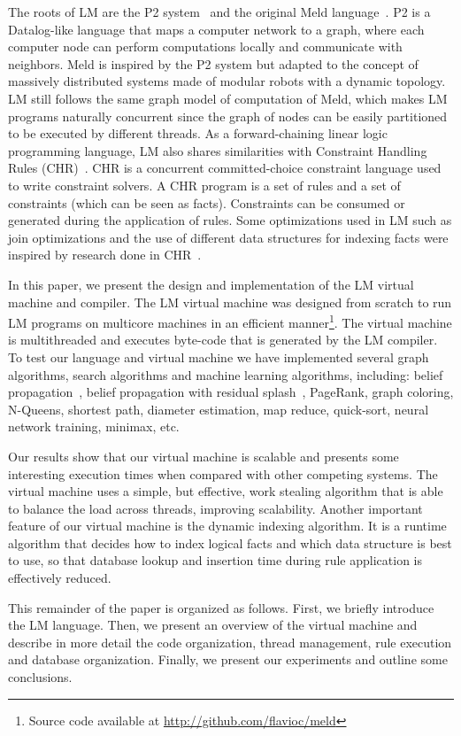 The roots of LM are the P2 system~\cite{Loo-condie-garofalakis-p2} and
the original Meld
language~\cite{ashley-rollman-derosa-iros07wksp,ashley-rollman-iclp09}. P2
is a Datalog-like language that maps a computer network to a graph,
where each computer node can perform computations locally and
communicate with neighbors. Meld is inspired by the P2 system
but adapted to the concept of massively distributed systems made of
modular robots with a dynamic topology. LM still follows the same
graph model of computation of Meld, which makes LM programs naturally
concurrent since the graph of nodes can be easily partitioned to be
executed by different threads. As a forward-chaining linear logic
programming language, LM also shares similarities with Constraint
Handling Rules
(CHR)~\cite{Betz:2005kx,DBLP:journals/corr/abs-1006-3039}.  CHR is a
concurrent committed-choice constraint language used to write
constraint solvers. A CHR program is a set of rules and a set of
constraints (which can be seen as facts). Constraints can be consumed
or generated during the application of rules. Some optimizations
used in LM such as join optimizations and the use of different data
structures for indexing facts were inspired by research done in
CHR~\cite{DBLP:journals/corr/cs-PL-0408025}.

In this paper, we present the design and implementation of the LM virtual machine
and compiler.
The LM virtual machine was designed from scratch to run LM programs on
multicore machines in an efficient manner\footnote{Source code available at \url{http://github.com/flavioc/meld}}.
The virtual machine is multithreaded and executes byte-code that is generated
by the LM compiler. To test our language and virtual machine we have implemented several graph algorithms, search
algorithms and machine learning algorithms, including: belief
propagation~\cite{Gonzalez+al:aistats09paraml}, belief propagation
with residual splash~\cite{Gonzalez+al:aistats09paraml}, PageRank,
graph coloring, N-Queens, shortest path, diameter estimation, map
reduce, quick-sort, neural network training, minimax, etc.

Our results show that our virtual machine is scalable and presents some interesting
execution times when compared with other competing systems.
The virtual machine uses a simple, but effective, work stealing algorithm
that is able to balance the load across threads, improving scalability.
Another important feature of our virtual machine is the dynamic indexing algorithm.
It is a runtime algorithm that decides how to index logical facts and which
data structure is best to use, so that database lookup and insertion time during rule application
is effectively reduced.

This remainder of the paper is organized as follows. First, we briefly
introduce the LM language. Then, we present an overview of the virtual
machine and describe in more detail the code organization, thread
management, rule execution and database organization. Finally, we
present our experiments and outline some conclusions.
